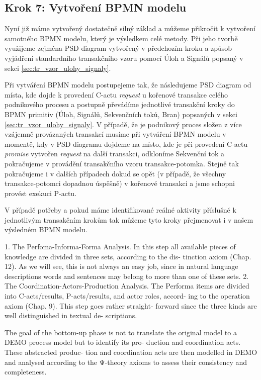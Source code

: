 \documentclass[]{article}
\begin{document}
\subsection{Krok 7: Vytvoření BPMN modelu}
Nyní již máme vytvořený dostatečně silný základ a můžeme přikročit k vytvoření samotného BPMN modelu, který je výsledkem celé metody. Při jeho tvorbě využijeme zejména PSD diagram vytvořený v předchozím kroku a způsob vyjádření standardního transakčního vzoru pomocí Úloh a Signálů popsaný v sekci \ref{sec:tr_vzor_ulohy_signaly}.

Při vytváření BPMN modelu postupejeme tak, že následujeme PSD diagram od místa, kde dojde k provedení C-actu \textit{request} u kořenové transakce celého podnikového procesu a postupně převádíme jednotlivé transakční kroky do BPMN primitiv (Úloh, Signálů, Sekvenčních toků, Bran) popsaných v sekci \ref{sec:tr_vzor_ulohy_signaly}. V případě, že je podnikový proces složen z více vzájemně provázaných transakcí musíme při vytváření BPMN modelu v momentě, kdy v PSD diagramu dojdeme na místo, kde je při provedení C-actu \textit{promise} vytvořen \textit{request} na další transakci, odkloníme Sekvenční tok a pokračujeme v provádění transakčního vzoru transakce-potomka. Stejně tak pokračujeme i v dalších případech dokud se opět  (v případě, že všechny transakce-potomci dopadnou úspěšně) v kořenové transakci a jsme schopni provést exekuci P-actu.

V případě potřeby a pokud máme identifikované reálné aktivity příslušné k jednotlivým transakčním krokům tak můžeme tyto kroky přejmenovat i v našem výsledném BPMN modelu. %

1. The Perfoma-Informa-Forma Analysis. In this step all available pieces of knowledge are divided in three sets, according to the dis- tinction axiom (Chap. 12). As we will see, this is not always an easy job, since in natural language descriptions words and sentences may belong to more than one of these sets.
2. The Coordination-Actors-Production Analysis. The Performa items are divided into C-acts/results, P-acts/results, and actor roles, accord- ing to the operation axiom (Chap. 9). This step goes rather straight- forward since the three kinds are well distinguished in textual de- scriptions.

The goal of the bottom-up phase is not to translate the original model to a DEMO process model but to identify its pro- duction and coordination acts. These abstracted produc- tion and coordination acts are then modelled in DEMO and analysed according to the Ψ-theory axioms to assess their consistency and completeness.
\end{document}
